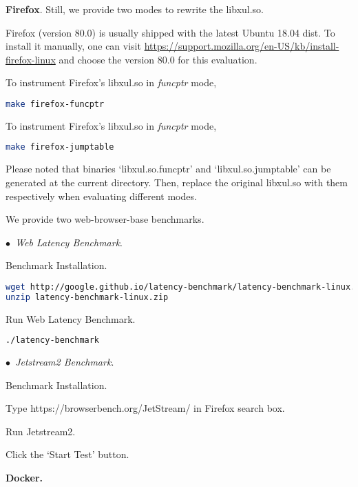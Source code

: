 \documentclass{sigplanconf}
\begin{document}
{\vspace{2pt}\noindent\textbf{Firefox}. Still, we provide two modes to rewrite the libxul.so.

Firefox (version 80.0) is usually shipped with the latest Ubuntu 18.04 dist. 
To install it manually, one can visit \url{https://support.mozilla.org/en-US/kb/install-firefox-linux} and choose the version 80.0 for this evaluation.


To instrument Firefox’s libxul.so in \textit{funcptr} mode, 

\begin{lstlisting}[language=bash]
  make firefox-funcptr
\end{lstlisting}

To instrument Firefox’s libxul.so in \textit{funcptr} mode, 

\begin{lstlisting}[language=bash]
  make firefox-jumptable
\end{lstlisting}


Please noted that binaries `libxul.so.funcptr' and `libxul.so.jumptable' can be generated at the current directory. 
Then, replace the original libxul.so with them respectively when evaluating different modes.

We provide two web-browser-base benchmarks.

\vspace{1pt}\noindent$\bullet$\textit{~Web Latency Benchmark}.

Benchmark Installation.

\begin{lstlisting}[language=bash]
wget http://google.github.io/latency-benchmark/latency-benchmark-linux.zip
unzip latency-benchmark-linux.zip
\end{lstlisting}

Run Web Latency Benchmark.

\begin{lstlisting}[language=bash]
./latency-benchmark
\end{lstlisting}

\vspace{1pt}\noindent$\bullet$\textit{~Jetstream2 Benchmark}.

Benchmark Installation.

Type https://browserbench.org/JetStream/ in Firefox search box.

Run Jetstream2.

Click the `Start Test' button.

\vspace{2pt}\noindent\textbf{Docker.}

}
\end{document}
